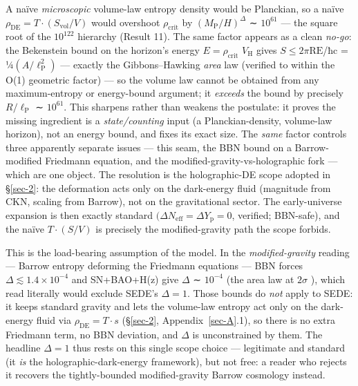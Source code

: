 \documentclass[preprint,12pt]{elsarticle}
\begin{document}
A naïve \emph{microscopic} volume-law entropy density would be
Planckian, so a naïve
\(\rho _\mathrm{DE} = T\cdot (S_{\mathrm{vol}}/V)\) would overshoot
\(\rho _{\mathrm{crit}}\) by \((M_{\mathrm{P}}/H)^{\Delta }\) ∼
\(10^{61}\) --- the square root of the \(10^{122}\) hierarchy (Result
11). The same factor appears as a clean \emph{no-go}: the Bekenstein
bound on the horizon's energy \(E = \rho _{\mathrm{crit}}\)
\(V_{\mathrm{H}}\) gives \(S \leq  2\pi \mathrm{RE}\)/ħc =
¼\((A/\ell _{\mathrm{P}}^{2})\) --- exactly the Gibbons--Hawking
\emph{area} law (verified to within the O(1) geometric factor) --- so
the volume law cannot be obtained from any maximum-entropy or
energy-bound argument; it \emph{exceeds} the bound by precisely
\(R/\ell _{\mathrm{P}}\) ∼ \(10^{61}\). This sharpens rather than
weakens the postulate: it proves the missing ingredient is a
\emph{state/counting} input (a Planckian-density, volume-law horizon),
not an energy bound, and fixes its exact size. The \emph{same} factor
controls three apparently separate issues --- this seam, the BBN bound
on a Barrow-modified Friedmann equation, and the
modified-gravity-vs-holographic fork --- which are one object. The
resolution is the holographic-DE scope adopted in §\ref{sec-2}: the
deformation acts only on the dark-energy fluid (magnitude from CKN,
scaling from Barrow), not on the gravitational sector. The
early-universe expansion is then exactly standard
\((\Delta N_{\mathrm{eff}} = \Delta Y_{\mathrm{p}} = 0\), verified;
BBN-safe), and the naïve \(T\cdot (S/V)\) is precisely the
modified-gravity path the scope forbids.

This is the load-bearing assumption of the model. In the
\emph{modified-gravity} reading --- Barrow entropy deforming the
Friedmann equations \citep{Asghari:2021bqa} --- BBN forces
\(\Delta  \lesssim  1.4\times 10^{-4}\) \citep{Barrow:2020kug} and
SN+BAO+H(z) give \(\Delta\) ∼ \(10^{-4}\) (the area law at \(2\sigma\)
\citep{Leon:2021wyx}), which read literally would exclude SEDE's
\(\Delta  = 1\). Those bounds do \emph{not} apply to SEDE: it keeps
standard gravity and lets the volume-law entropy act only on the
dark-energy fluid via \(\rho _\mathrm{DE} = T\cdot s\) (§\ref{sec-2},
Appendix~\ref{sec-A}.1), so there is no extra Friedmann term, no BBN
deviation, and \(\Delta\) is unconstrained by them. The headline
\(\Delta  = 1\) thus rests on this single scope choice --- legitimate
and standard (it \emph{is} the holographic-dark-energy framework), but
not free: a reader who rejects it recovers the tightly-bounded
modified-gravity Barrow cosmology instead.
\end{document}
